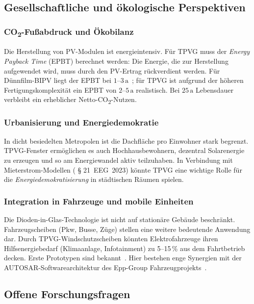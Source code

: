﻿\documentclass[a4paper,12pt]{article}
\theoremstyle{definition}
\theoremstyle{remark}
\begin{document}
\subsection{Gesellschaftliche und ökologische Perspektiven}

\subsubsection{CO\textsubscript{2}-Fußabdruck und Ökobilanz}
Die Herstellung von PV-Modulen ist energieintensiv. Für TPVG muss
der \emph{Energy Payback Time} (EPBT) berechnet werden: Die
Energie, die zur Herstellung aufgewendet wird, muss durch den PV-Ertrag
rückverdient werden. Für Dünnfilm-BIPV liegt der EPBT bei
$1$--$3\,\mathrm{a}$~\cite{NREL2014}; für TPVG ist aufgrund der
höheren Fertigungskomplexität ein EPBT von $2$--$5\,\mathrm{a}$
realistisch. Bei $25\,\mathrm{a}$ Lebensdauer verbleibt ein erheblicher
Netto-CO\textsubscript{2}-Nutzen.

\subsubsection{Urbanisierung und Energiedemokratie}
In dicht besiedelten Metropolen ist die Dachfläche pro Einwohner
stark begrenzt. TPVG-Fenster ermöglichen es auch Hochhausbewohnern,
dezentral Solarenergie zu erzeugen und so am Energiewandel aktiv
teilzuhaben. In Verbindung mit Mieterstrom-Modellen ( § 21~EEG~2023)
könnte TPVG eine wichtige Rolle für die \emph{Energiedemokratisierung}
in städtischen Räumen spielen.

\subsubsection{Integration in Fahrzeuge und mobile Einheiten}
Die Dioden-in-Glas-Technologie ist nicht auf stationäre Gebäude
beschränkt. Fahrzeugscheiben (Pkw, Busse, Züge) stellen eine
weitere bedeutende Anwendung dar. Durch TPVG-Windschutzscheiben
könnten Elektrofahrzeuge ihren Hilfsenergiebedarf (Klimaanlage,
Infotainment) zu 5--15\,\% aus dem Fahrtbetrieb decken.
Erste Prototypen sind bekannt~\cite{Toyota2023}. Hier bestehen enge
Synergien mit der AUTOSAR-Softwarearchitektur des Epp-Group
Fahrzeugprojekts~\cite{Epp2026AUTOSAR}.

\subsection{Offene Forschungsfragen}
\end{document}
